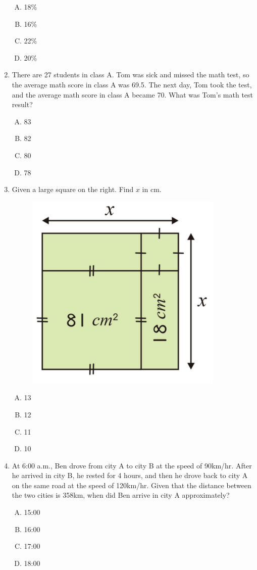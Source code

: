 \documentclass[12pt]{scrartcl}
\begin{document}
\begin{enumerate}
\begin{enumerate}[(A)]
    \item 18\% \item 16\% \item 22\% \item 20\%
\end{enumerate}

\item There are 27 students in class A. Tom was sick and missed the math test, so the average math score in class A was 69.5. The next day, Tom took the test, and the average math score in class A became 70. What was Tom's math test result?
\begin{enumerate}[(A)]
    \item 83 \item 82 \item 80 \item 78
\end{enumerate}

\item Given a large square on the right. Find $x$ in cm.
\begin{figure}[h]
    \centering
    \includegraphics{StarGen/0Figure/wmi-2020-5a-square.png}
\end{figure}
\begin{enumerate}[(A)]
    \item 13 \item 12 \item 11 \item 10
\end{enumerate}

\item At 6:00 a.m., Ben drove from city A to city B at the speed of 90km/hr. After he arrived in city B, he rested for 4 hours, and then he drove back to city A on the same road at the speed of 120km/hr. Given that the distance between the two cities is 358km, when did Ben arrive in city A approximately?
\begin{enumerate}[(A)]
    \item 15:00 \item 16:00 \item 17:00 \item 18:00
\end{enumerate}


\end{enumerate}
\end{document}
